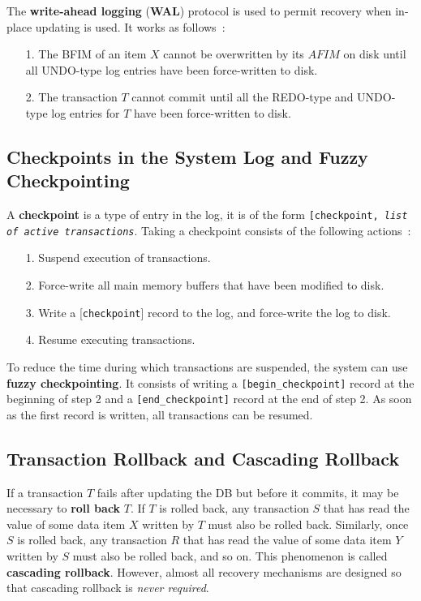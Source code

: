 \begin{samepage}
The \textbf{write-ahead logging} (\textbf{WAL}) protocol is used to permit recovery when in-place updating is used. It works as follows~:

\begin{itemize}
    \item[1.] The BFIM of an item $X$ cannot be overwritten by its $AFIM$ on disk until all UNDO-type log entries have been force-written to disk.
    \item[2.] The transaction $T$ cannot commit until all the REDO-type and UNDO-type log entries for $T$ have been force-written to disk.
\end{itemize}
\end{samepage}

\subsection{Checkpoints in the System Log and Fuzzy Checkpointing}
A \textbf{checkpoint} is a type of entry in the log, it is of the form \texttt{[checkpoint, \textit{list of active transactions}}. Taking a checkpoint consists of the following actions~:

\begin{itemize}
    \item[1.] Suspend execution of transactions.
    \item[2.] Force-write all main memory buffers that have been modified to disk.
    \item[3.] Write a [\texttt{checkpoint}] record to the log, and force-write the log to disk.
    \item[4.] Resume executing transactions.
\end{itemize}

To reduce the time during which transactions are suspended, the system can use \textbf{fuzzy checkpointing}. It consists of writing a \texttt{[begin\_checkpoint]} record at the beginning of step 2 and a \texttt{[end\_checkpoint]} record at the end of step 2. As soon as the first record is written, all transactions can be resumed.

\subsection{Transaction Rollback and Cascading Rollback}

If a transaction $T$ fails after updating the DB but before it commits, it may be necessary to \textbf{roll back} $T$. If $T$ is rolled back, any transaction $S$ that has read the value of some data item $X$ written by $T$ must also be rolled back. Similarly, once $S$ is rolled back, any transaction $R$ that has read the value of some data item $Y$ written by $S$ must also be rolled back, and so on. This phenomenon is called \textbf{cascading rollback}. However, almost all recovery mechanisms are designed so that cascading rollback is \textit{never required}. 


